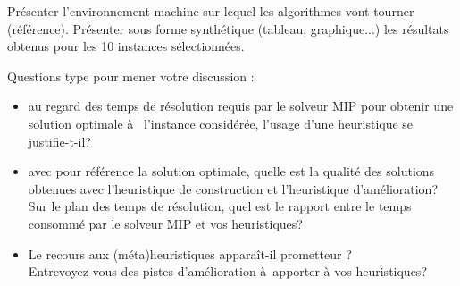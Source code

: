\noindent
Présenter l'environnement machine sur lequel les algorithmes vont tourner (référence). 
Présenter  sous forme synthétique (tableau, graphique...) les résultats obtenus pour les 10 instances sélectionnées.

%
%

\vspace{5mm}
\noindent
{}
\vspace{2mm}

\noindent
Questions type pour mener votre discussion :

\begin{itemize}
\item au regard des temps de résolution requis par le solveur MIP pour obtenir une solution optimale à  l'instance considérée, l'usage d'une heuristique se justifie-t-il?

\item avec pour référence la solution optimale, quelle est la qualité des solutions obtenues avec l'heuristique de construction et l'heuristique d'amélioration? \\
Sur le plan des temps de résolution, quel est le rapport  entre le temps consommé par le solveur MIP et vos heuristiques?

\item Le recours aux (méta)heuristiques apparaît-il prometteur ? \\
Entrevoyez-vous des pistes d'amélioration à apporter à vos heuristiques?

\vfill
\break

\end{itemize}
